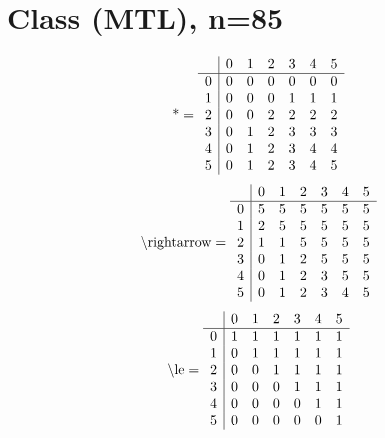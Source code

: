 \documentclass[11pt]{article}
\begin{document}
\section{Class (MTL), n=85}
\[\text{*} = 
\begin{array}{r | r r r r r r}
 & 0 & 1 & 2 & 3 & 4 & 5 \\ \hline
0 & 0 & 0 & 0 & 0 & 0 & 0 \\
1 & 0 & 0 & 0 & 1 & 1 & 1 \\
2 & 0 & 0 & 2 & 2 & 2 & 2 \\
3 & 0 & 1 & 2 & 3 & 3 & 3 \\
4 & 0 & 1 & 2 & 3 & 4 & 4 \\
5 & 0 & 1 & 2 & 3 & 4 & 5 \\
\end{array}
\]
\[\text{\textbackslash rightarrow} = 
\begin{array}{r | r r r r r r}
 & 0 & 1 & 2 & 3 & 4 & 5 \\ \hline
0 & 5 & 5 & 5 & 5 & 5 & 5 \\
1 & 2 & 5 & 5 & 5 & 5 & 5 \\
2 & 1 & 1 & 5 & 5 & 5 & 5 \\
3 & 0 & 1 & 2 & 5 & 5 & 5 \\
4 & 0 & 1 & 2 & 3 & 5 & 5 \\
5 & 0 & 1 & 2 & 3 & 4 & 5 \\
\end{array}
\]
\[\text{\textbackslash le} = 
\begin{array}{r | r r r r r r}
 & 0 & 1 & 2 & 3 & 4 & 5 \\ \hline
0 & 1 & 1 & 1 & 1 & 1 & 1 \\
1 & 0 & 1 & 1 & 1 & 1 & 1 \\
2 & 0 & 0 & 1 & 1 & 1 & 1 \\
3 & 0 & 0 & 0 & 1 & 1 & 1 \\
4 & 0 & 0 & 0 & 0 & 1 & 1 \\
5 & 0 & 0 & 0 & 0 & 0 & 1 \\
\end{array}
\]
\end{document}
